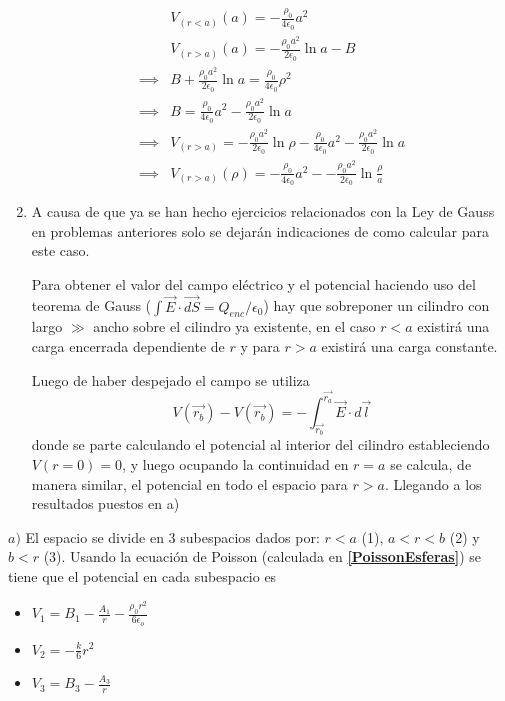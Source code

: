 \begin{enumerate}[label=\alph*)]
\begin{equation}
        \begin{split}
            &V_{(r<a)}(a) = -\frac{\rho_0}{4\epsilon_0}a^2\\
            &V_{(r>a)}(a) = -\frac{\rho_0a^2}{2\epsilon_0}\ln{a} - B\\
            \implies &B + \frac{\rho_0a^2}{2\epsilon_0}\ln{a} = \frac{\rho_0}{4\epsilon_0}\rho^2\\
            \implies &B = \frac{\rho_0}{4\epsilon_0}a^2 - \frac{\rho_0a^2}{2\epsilon_0}\ln{a}\\
            \implies &V_{(r>a)} = -\frac{\rho_0a^2}{2\epsilon_0}\ln{\rho} -\frac{\rho_0}{4\epsilon_0}a^2 - \frac{\rho_0a^2}{2\epsilon_0}\ln{a}\\
            \implies &V_{(r>a)}(\rho) = -\frac{\rho_0}{4\epsilon_0}a^2 - -\frac{\rho_0a^2}{2\epsilon_0}\ln{\frac{\rho}{a}}
        \end{split}
        \nonumber
    \end{equation}
    
    
    \item A causa de que ya se han hecho ejercicios relacionados con la Ley de Gauss en problemas anteriores solo se dejarán indicaciones de como calcular para este caso. 
    
    Para obtener el valor del campo eléctrico y el potencial haciendo uso del teorema de Gauss ($\int\vec{E}\cdot\vec{dS} = Q_{enc}/\epsilon_0$) hay que sobreponer un cilindro con largo $\gg$ ancho sobre el cilindro ya existente, en el caso $r<a$ existirá una carga encerrada dependiente de $r$ y para $r>a$ existirá una carga constante. 
    
    Luego de haber despejado el campo se utiliza \[V(\vec{r_b}) - V(\vec{r_b}) = -\int_{\vec{r_b}}^{\vec{r_a}}\vec{E}\cdot d\vec{l} \] donde se parte calculando el potencial al interior del cilindro estableciendo $V(r=0) = 0$, y luego ocupando la continuidad en $r=a$ se calcula, de manera similar, el potencial en todo el espacio para $r>a$. Llegando a los resultados puestos en a)
\end{enumerate}
\bigbreak
\bigbreak
{}\newline %

$a)$ El espacio se divide en 3 subespacios dados por: $r<a$ (1), $a<r<b$ (2) y $b<r$ (3). Usando la ecuación de Poisson (calculada en \textbf{\ref{PoissonEsferas}}) se tiene que el potencial en cada subespacio es

\begin{itemize}
    \item $V_1 = B_1-\frac{A_1}{r}-\frac{\rho_0 r^2}{6\epsilon_o}$
    \item $V_2 = -\frac{k}{6}r^2$
    \item $V_3 = B_3-\frac{A_3}{r}$
\end{itemize}

